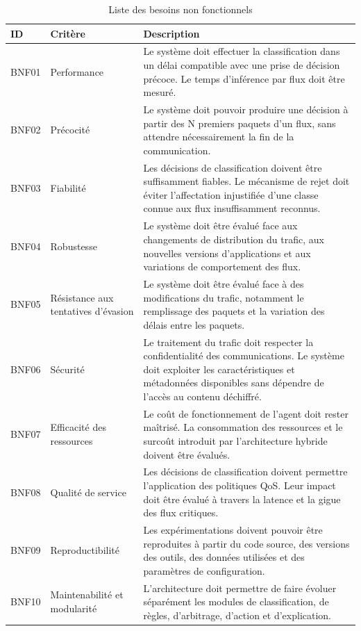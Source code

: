 \begin{table}[H]
\centering
\caption{Liste des besoins non fonctionnels}
\label{tab:besoins-non-fonctionnels}
\small
\begin{tabularx}{\textwidth}{|p{1.4cm}|p{3.2cm}|Y|}
\hline
\textbf{ID} & \textbf{Critère} & \textbf{Description} \\
\hline

BNF01 & Performance &
Le système doit effectuer la classification dans un délai
compatible avec une prise de décision précoce. Le temps
d'inférence par flux doit être mesuré. \\
\hline

BNF02 & Précocité &
Le système doit pouvoir produire une décision à partir des
N premiers paquets d'un flux, sans attendre nécessairement
la fin de la communication. \\
\hline

BNF03 & Fiabilité &
Les décisions de classification doivent être suffisamment
fiables. Le mécanisme de rejet doit éviter l'affectation
injustifiée d'une classe connue aux flux insuffisamment
reconnus. \\
\hline

BNF04 & Robustesse &
Le système doit être évalué face aux changements de
distribution du trafic, aux nouvelles versions d'applications
et aux variations de comportement des flux. \\
\hline

BNF05 & Résistance aux tentatives d'évasion &
Le système doit être évalué face à des modifications du
trafic, notamment le remplissage des paquets et la variation
des délais entre les paquets. \\
\hline

BNF06 & Sécurité &
Le traitement du trafic doit respecter la confidentialité
des communications. Le système doit exploiter les
caractéristiques et métadonnées disponibles sans dépendre
de l'accès au contenu déchiffré. \\
\hline

BNF07 & Efficacité des ressources &
Le coût de fonctionnement de l'agent doit rester maîtrisé.
La consommation des ressources et le surcoût introduit
par l'architecture hybride doivent être évalués. \\
\hline

BNF08 & Qualité de service &
Les décisions de classification doivent permettre
l'application des politiques QoS. Leur impact doit être
évalué à travers la latence et la gigue des flux critiques. \\
\hline

BNF09 & Reproductibilité &
Les expérimentations doivent pouvoir être reproduites
à partir du code source, des versions des outils, des
données utilisées et des paramètres de configuration. \\
\hline

BNF10 & Maintenabilité et modularité &
L'architecture doit permettre de faire évoluer séparément
les modules de classification, de règles, d'arbitrage,
d'action et d'explication. \\
\hline

\end{tabularx}
\end{table}

